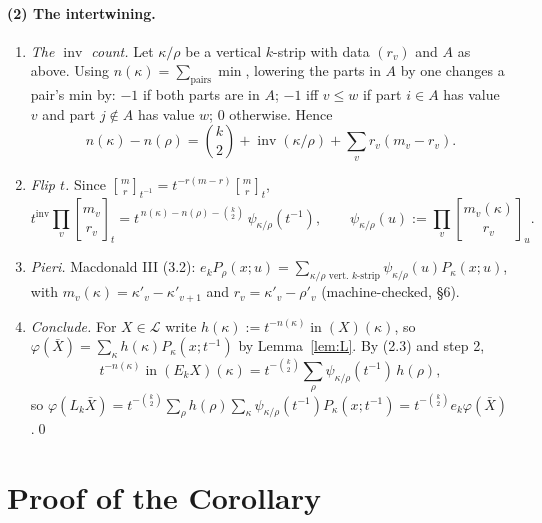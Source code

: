 \documentclass[11pt]{article}
\theoremstyle{definition}
\newcommand{\inn}{\operatorname{in}}
\newcommand{\inv}{\operatorname{inv}}
\newcommand{\cL}{\mathcal{L}}
\newcommand{\gbin}[3]{\genfrac{[}{]}{0pt}{}{#1}{#2}_{#3}}
\begin{document}
\paragraph{(2) The intertwining.}
\begin{enumerate}[label=\arabic*.]
\item \emph{The $\inv$ count.} Let $\kappa/\rho$ be a vertical $k$-strip with data $(r_v)$ and $A$ as above. Using $n(\kappa)=\sum_{\text{pairs}}\min$, lowering the parts in $A$ by one changes a pair's min by: $-1$ if both parts are in $A$; $-1$ iff $v\le w$ if part $i\in A$ has value $v$ and part $j\notin A$ has value $w$; $0$ otherwise. Hence
\begin{equation}\tag{3.1}
n(\kappa)-n(\rho)=\binom k2+\inv(\kappa/\rho)+\sum_vr_v(m_v-r_v).
\end{equation}
\item \emph{Flip $t$.} Since $\gbin mr{t^{-1}}=t^{-r(m-r)}\gbin mrt$,
\[t^{\inv}\prod_v\gbin{m_v}{r_v}t=t^{\,n(\kappa)-n(\rho)-\binom k2}\,\psi_{\kappa/\rho}(t^{-1}),\qquad\psi_{\kappa/\rho}(u):=\prod_v\gbin{m_v(\kappa)}{r_v}u.\]
\item \emph{Pieri.} Macdonald III (3.2): $e_kP_\rho(x;u)=\sum_{\kappa/\rho\text{ vert.\ }k\text{-strip}}\psi_{\kappa/\rho}(u)P_\kappa(x;u)$, with $m_v(\kappa)=\kappa'_v-\kappa'_{v+1}$ and $r_v=\kappa'_v-\rho'_v$ (machine-checked, \S6).
\item \emph{Conclude.} For $X\in\cL$ write $h(\kappa):=t^{-n(\kappa)}\inn(X)(\kappa)$, so $\varphi(\bar X)=\sum_\kappa h(\kappa)P_\kappa(x;t^{-1})$ by Lemma~\ref{lem:L}. By (2.3) and step 2,
\[t^{-n(\kappa)}\inn(E_kX)(\kappa)=t^{-\binom k2}\sum_\rho\psi_{\kappa/\rho}(t^{-1})\,h(\rho),\]
so $\varphi(L_k\bar X)=t^{-\binom k2}\sum_\rho h(\rho)\sum_\kappa\psi_{\kappa/\rho}(t^{-1})P_\kappa(x;t^{-1})=t^{-\binom k2}e_k\varphi(\bar X)$.\qed
\end{enumerate}

\section{Proof of the Corollary}
\end{document}
